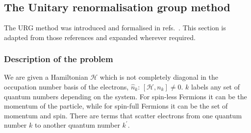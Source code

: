 \chapter{\chapB}\label{sec:Methods}

\section{The Unitary renormalisation group method}
The URG method was introduced and formalised in refs.~\cite{anirbanurg1,anirbanurg2,anirbanmott1,anirbanmott2}.  This section is adapted from those references and expanded wherever required.
\subsection*{Description of the problem}
We are given a Hamiltonian \(\mathcal{H}\) which is not completely diagonal in the occupation number basis of the electrons, \(\hat n_k\): \(\left[\mathcal{H},n_k\right] \neq 0\). \(k\) labels any set of quantum numbers depending on the system. For spin-less Fermions it can be the momentum of the particle, while for spin-full Fermions it can be the set of momentum and spin. There are terms that scatter electrons from one quantum number \(k\) to another quantum number \(k^\prime\).

